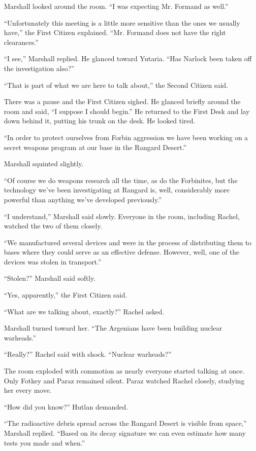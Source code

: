 Marshall looked around the room. ``I was expecting Mr. Formand as well.''

``Unfortunately this meeting is a little more sensitive than the ones we usually have,'' the
First Citizen explained. ``Mr. Formand does not have the right clearances.''

``I see,'' Marshall replied. He glanced toward Yutaria. ``Has Narlock been taken off the
investigation also?''

``That is part of what we are here to talk about,'' the Second Citizen said.

There was a pause and the First Citizen sighed. He glanced briefly around the room and said, ``I
suppose I should begin.'' He returned to the First Desk and lay down behind it, putting his
trunk on the desk. He looked tired.

``In order to protect ourselves from Forbin aggression we have been working on a secret weapons
program at our base in the Rangard Desert.''

Marshall squinted slightly.

``Of course we do weapons research all the time, as do the Forbinites, but the technology we've
been investigating at Rangard is, well, considerably more powerful than anything we've developed
previously.''

``I understand,'' Marshall said slowly. Everyone in the room, including Rachel, watched the two
of them closely.

``We manufactured several devices and were in the process of distributing them to bases where
they could serve as an effective defense. However, well, one of the devices was stolen in
transport.''

``Stolen?'' Marshall said softly.

``Yes, apparently,'' the First Citizen said.

``What are we talking about, exactly?'' Rachel asked.

Marshall turned toward her. ``The Argenians have been building nuclear warheads.''

``Really?'' Rachel said with shock. ``Nuclear warheads?''

The room exploded with commotion as nearly everyone started talking at once. Only Fotkey and
Paraz remained silent. Paraz watched Rachel closely, studying her every move.

``How did you know?'' Hutlan demanded.

``The radioactive debris spread across the Rangard Desert is visible from space,'' Marshall
replied. ``Based on its decay signature we can even estimate how many tests you made and when.''


